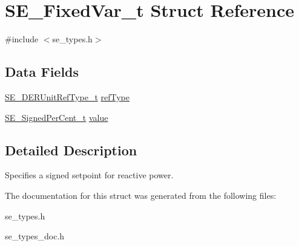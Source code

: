 \hypertarget{structSE__FixedVar__t}{}\section{S\+E\+\_\+\+Fixed\+Var\+\_\+t Struct Reference}
\label{structSE__FixedVar__t}


{\ttfamily \#include $<$se\+\_\+types.\+h$>$}

\subsection*{Data Fields}
\begin{DoxyCompactItemize}
\item 
\hyperlink{group__DERUnitRefType_gaff0b9dcda4cd888095dba6d262e5ce86}{S\+E\+\_\+\+D\+E\+R\+Unit\+Ref\+Type\+\_\+t} \hyperlink{group__FixedVar_ga31589f44bcf481d8498e94522f685e58}{ref\+Type}
\item 
\hyperlink{group__SignedPerCent_ga3a844f23440f7c1756032f6ef2359fdf}{S\+E\+\_\+\+Signed\+Per\+Cent\+\_\+t} \hyperlink{group__FixedVar_gae431366e46ceeb682588ee1bcfcc9de9}{value}
\end{DoxyCompactItemize}


\subsection{Detailed Description}
Specifies a signed setpoint for reactive power. 

The documentation for this struct was generated from the following files\+:\begin{DoxyCompactItemize}
\item 
se\+\_\+types.\+h\item 
se\+\_\+types\+\_\+doc.\+h\end{DoxyCompactItemize}

